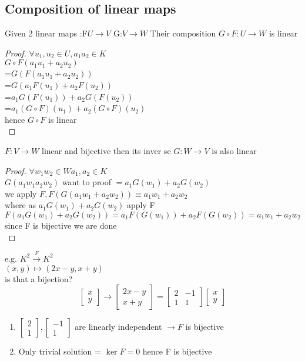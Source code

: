 \documentclass{article}
\newcommand\m[1]{\begin{bmatrix}#1\end{bmatrix}}
\newcommand{\li}{linearly independent }
\begin{document}
\subsection{Composition of linear maps}
\begin{theorem}
    
    Given 2 linear maps :F$U \to V$ G:$V \to W $ Their composition $G \circ F : U \to W$ is linear 
\end{theorem}
\begin{proof}
    $\forall u_1, u_2 \in U, a_1a_2 \in K$
    \\$G \circ F(a_1u_1+a_2u_2
    )$
    \\=$G(F(a_1u_1+a_2u_2))$
    \\=$G(a_1F(u_1)+a_2F(u_2))$
    \\=$a_1G(F(u_1))+a_2G(F(u_2))$
    \\=$a_1(G\circ F)(u_1)+a_2(G\circ F)(u_2)$
    \\hence $G\circ F$ is linear\\
    
\end{proof}
\begin{theorem}
    $F:V\to W $ linear and bijective then its inver se $G:W \to V $ is also linear 
\end{theorem}
\begin{proof}
    $\forall w_1w_2 \in W a_1,a_2 \in K$\\$G(a_1w_1a_2w_2) $ want to proof $=a_1G(w_1)+a_2G(w_2)$
    \\
    we apply $F, F(G(a_1w_1+a_2w_2))\equiv a_1w_1+a_2w_2$\\
    where as $a_1G(w_1)+a_2G(w_2) $ apply F$F(a_1G(w_1)+a_2G(w_2))=a_1F(G(w_1))+a_2F(G(w_2))=a_1w_1+a_2w_2$ \\since F is bijective we are done\\
    
\end{proof}

e.g. $K^2 \xrightarrow{F} K^2$
\\$(x,y) \mapsto (2x-y,x+y)$\\
is that a bijection?\\
$$\m{x\\y}\to\m{2x-y\\x+y}=\m{2&-1\\1&1}\m{x\\y}$$
\begin{enumerate}
    \item $\m{2\\1},\m{-1\\1}$ are \li $\to F$ is bijective\\
    \item Only trivial solution = $\ker F=0$ hence F is bijective
\end{enumerate}
\end{document}

